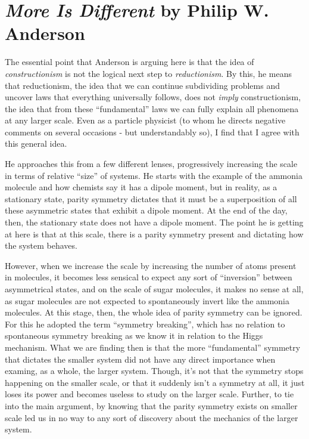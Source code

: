\section{\textit{More Is Different} by Philip W. Anderson}

The essential point that Anderson is arguing here is that the idea of \textit{constructionism} is not the logical next step to \textit{reductionism}. By this, he means that reductionism, the idea that we can continue subdividing problems and uncover laws that everything universally follows, does not \textit{imply} constructionism, the idea that from these ``fundamental'' laws we can fully explain all phenomena at any larger scale. Even as a particle physicist (to whom he directs negative comments on several occasions - but understandably so), I find that I agree with this general idea.

He approaches this from a few different lenses, progressively increasing the scale in terms of relative ``size'' of systems. He starts with the example of the ammonia molecule and how chemists say it has a dipole moment, but in reality, as a stationary state, parity symmetry dictates that it must be a superposition of all these asymmetric states that exhibit a dipole moment. At the end of the day, then, the stationary state does not have a dipole moment. The point he is getting at here is that at this scale, there is a parity symmetry present and dictating how the system behaves.

However, when we increase the scale by increasing the number of atoms present in molecules, it becomes less sensical to expect any sort of ``inversion'' between asymmetrical states, and on the scale of sugar molecules, it makes no sense at all, as sugar molecules are not expected to spontaneously invert like the ammonia molecules. At this stage, then, the whole idea of parity symmetry can be ignored. For this he adopted the term ``symmetry breaking'', which has no relation to spontaneous symmetry breaking as we know it in relation to the Higgs mechanism. What we are finding then is that the more ``fundamental'' symmetry that dictates the smaller system did not have any direct importance when examing, as a whole, the larger system. Though, it's not that the symmetry stops happening on the smaller scale, or that it suddenly isn't a symmetry at all, it just loses its power and becomes useless to study on the larger scale. Further, to tie into the main argument, by knowing that the parity symmetry exists on smaller scale led us in no way to any sort of discovery about the mechanics of the larger system.

